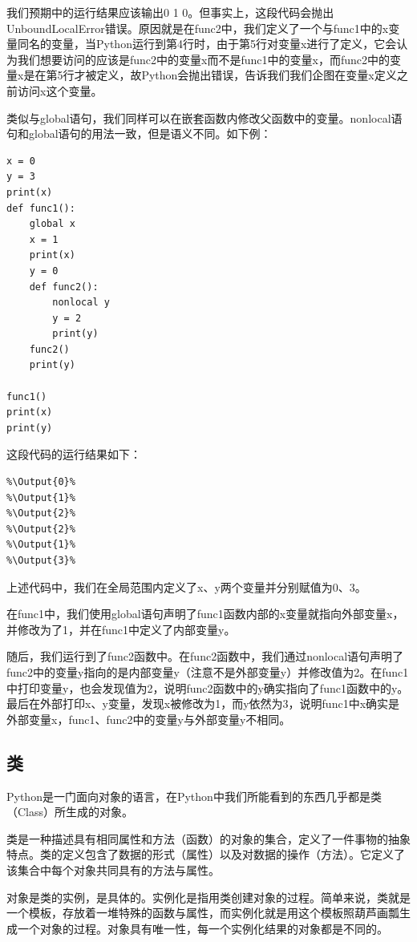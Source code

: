 \documentclass[../../Main.tex]{subfiles}
\begin{document}
我们预期中的运行结果应该输出0 1 0。但事实上，这段代码会抛出UnboundLocalError错误。原因就是在func2中，我们定义了一个与func1中的x变量同名的变量，当Python运行到第4行时，由于第5行对变量x进行了定义，它会认为我们想要访问的应该是func2中的变量x而不是func1中的变量x，而func2中的变量x是在第5行才被定义，故Python会抛出错误，告诉我们我们企图在变量x定义之前访问x这个变量。

类似与global语句，我们同样可以在嵌套函数内修改父函数中的变量。nonlocal语句和global语句的用法一致，但是语义不同。如下例：
\begin{lstlisting}
x = 0
y = 3
print(x)
def func1():
    global x 
    x = 1
    print(x)
    y = 0
    def func2():
        nonlocal y
        y = 2
        print(y)
    func2()
    print(y)

func1()
print(x)
print(y)
\end{lstlisting}

这段代码的运行结果如下：
\begin{lstlisting}
%\Output{0}%
%\Output{1}%
%\Output{2}%
%\Output{2}%
%\Output{1}%
%\Output{3}%
\end{lstlisting}

上述代码中，我们在全局范围内定义了x、y两个变量并分别赋值为0、3。

在func1中，我们使用global语句声明了func1函数内部的x变量就指向外部变量x，并修改为了1，并在func1中定义了内部变量y。

随后，我们运行到了func2函数中。在func2函数中，我们通过nonlocal语句声明了func2中的变量y指向的是内部变量y（注意不是外部变量y）并修改值为2。在func1中打印变量y，也会发现值为2，说明func2函数中的y确实指向了func1函数中的y。最后在外部打印x、y变量，发现x被修改为1，而y依然为3，说明func1中x确实是外部变量x，func1、func2中的变量y与外部变量y不相同。

\subsection{类}
Python是一门面向对象的语言，在Python中我们所能看到的东西几乎都是类（Class）所生成的对象。

类是一种描述具有相同属性和方法（函数）的对象的集合，定义了一件事物的抽象特点。类的定义包含了数据的形式（属性）以及对数据的操作（方法）。它定义了该集合中每个对象共同具有的方法与属性。

对象是类的实例，是具体的。实例化是指用类创建对象的过程。简单来说，类就是一个模板，存放着一堆特殊的函数与属性，而实例化就是用这个模板照葫芦画瓢生成一个对象的过程。对象具有唯一性，每一个实例化结果的对象都是不同的。
\end{document}
